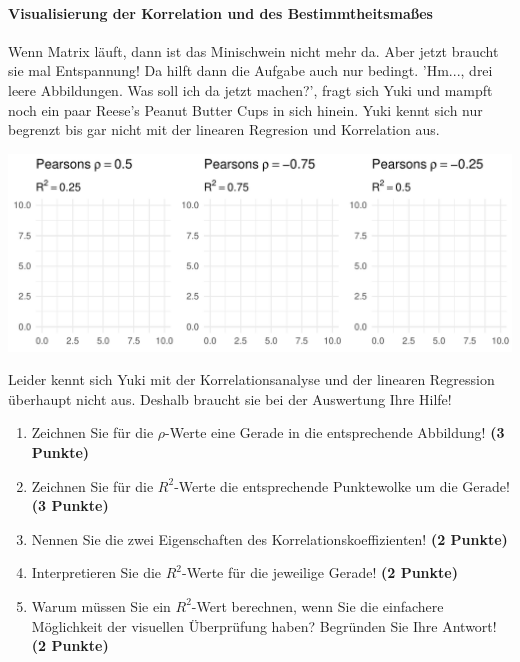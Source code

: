 \documentclass[a4paper, 9pt]{scrartcl}\usepackage[]{graphicx}\usepackage[]{xcolor}
\makeatletter
\def\maxwidth{ %
  \ifdim\Gin@nat@width>\linewidth
    \linewidth
  \else
    \Gin@nat@width
  \fi
}
\makeatother
\begin{document}
\ifcollection
\paragraph{Visualisierung der Korrelation und des Bestimmtheitsmaßes}
\fi

Wenn Matrix läuft, dann ist das Minischwein nicht mehr da. Aber jetzt braucht sie mal Entspannung! Da hilft dann die Aufgabe auch nur bedingt. 'Hm..., drei leere Abbildungen. Was soll ich da jetzt machen?', fragt sich Yuki und mampft noch ein paar Reese's Peanut Butter Cups in sich hinein. Yuki kennt sich nur begrenzt bis gar nicht mit der linearen Regresion und Korrelation aus.
\vspace{2Ex}



{\centering \includegraphics[width=\maxwidth]{img/correlation-01-1} 

}




\vspace{2Ex}

Leider kennt sich Yuki mit der Korrelationsanalyse und der linearen Regression überhaupt nicht aus. Deshalb braucht sie bei der Auswertung Ihre Hilfe!

\begin{enumerate}
\item Zeichnen Sie für die $\rho$-Werte eine Gerade in die entsprechende Abbildung! \textbf{(3 Punkte)}
\item Zeichnen Sie für die $R^2$-Werte die entsprechende Punktewolke um die Gerade! \textbf{(3 Punkte)}
\item Nennen Sie die zwei Eigenschaften des Korrelationskoeffizienten! \textbf{(2 Punkte)}
\item Interpretieren Sie die $R^2$-Werte für die jeweilige Gerade! \textbf{(2 Punkte)}
\item Warum müssen Sie ein $R^2$-Wert berechnen, wenn Sie die einfachere Möglichkeit der visuellen Überprüfung haben? Begründen Sie Ihre Antwort! \textbf{(2 Punkte)}
\end{enumerate}
 
\end{document}
